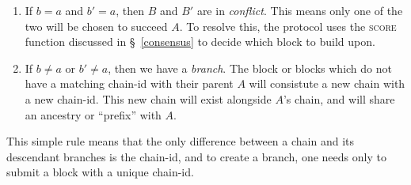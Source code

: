 \begin{enumerate}
    \item If $b = a$ and $b' = a$, then $B$ and $B'$ are in \emph{conflict}.
        This means only one of the two will be chosen to succeed $A$. To
        resolve this, the protocol uses the \textsc{score} function discussed
        in \S~\ref{consensus} to decide which block to build upon.
    \item If $b \neq a$ or $b' \neq a$, then we have a \emph{branch}. The block
        or blocks which do not have a matching chain-id with their parent $A$
        will consistute a new chain with a new chain-id. This new chain will
        exist alongside $A$'s chain, and will share an ancestry or ``prefix''
        with $A$.
\end{enumerate}

This simple rule means that the only difference between a chain and its
descendant branches is the chain-id, and to create a branch, one needs only to
submit a block with a unique chain-id.

 \\
 \\
 \\


